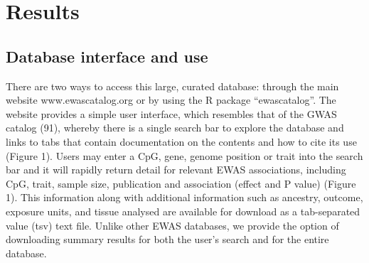 \documentclass[11pt,oneside]{bristolthesis}
\begin{document}
\hypertarget{results-03}{%
\section{Results}\label{results-03}}

\hypertarget{database-interface-and-use}{%
\subsection{Database interface and use}\label{database-interface-and-use}}

There are two ways to access this large, curated database: through the main website www.ewascatalog.org or by using the R package ``ewascatalog''. The website provides a simple user interface, which resembles that of the GWAS catalog (91), whereby there is a single search bar to explore the database and links to tabs that contain documentation on the contents and how to cite its use (Figure 1). Users may enter a CpG, gene, genome position or trait into the search bar and it will rapidly return detail for relevant EWAS associations, including CpG, trait, sample size, publication and association (effect and P value) (Figure 1). This information along with additional information such as ancestry, outcome, exposure units, and tissue analysed are available for download as a tab-separated value (tsv) text file. Unlike other EWAS databases, we provide the option of downloading summary results for both the user's search and for the entire database.
\end{document}
